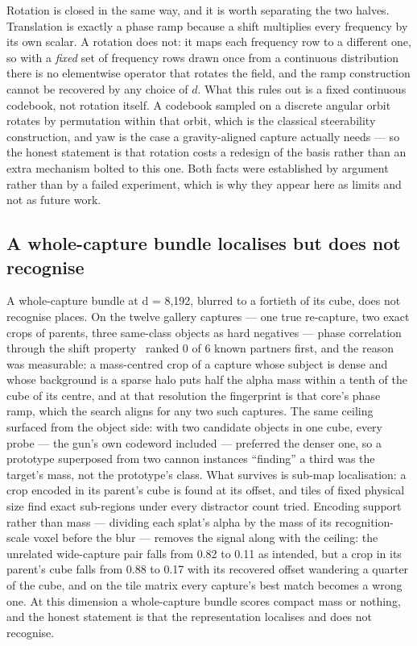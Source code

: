 \documentclass[11pt]{article}
\begin{document}
Rotation is closed in the same way, and it is worth separating the two
halves. Translation is exactly a phase ramp because a shift multiplies
every frequency by its own scalar. A rotation does not: it maps each
frequency row to a different one, so with a \emph{fixed} set of
frequency rows drawn once from a continuous distribution there is no
elementwise operator that rotates the field, and the ramp construction
cannot be recovered by any choice of $d$. What this rules out is a fixed
continuous codebook, not rotation itself. A codebook sampled on a
discrete angular orbit rotates by permutation within that orbit, which
is the classical steerability construction, and yaw is the case a
gravity-aligned capture actually needs --- so the honest statement is
that rotation costs a redesign of the basis rather than an extra
mechanism bolted to this one. Both facts were established by argument
rather than by a failed experiment, which is why they appear here as
limits and not as future work.

\subsection{A whole-capture bundle localises but does not recognise}

A whole-capture bundle at d = 8,192, blurred to a fortieth of its cube,
does not recognise places. On the twelve gallery captures --- one true
re-capture, two exact crops of parents, three same-class objects as hard
negatives --- phase correlation through the shift
property~\cite{voelker2021ssp} ranked 0 of 6 known partners first, and
the reason was measurable: a mass-centred crop of a capture whose
subject is dense and whose background is a sparse halo puts half the
alpha mass within a tenth of the cube of its centre, and at that
resolution the fingerprint is that core's phase ramp, which the search
aligns for any two such captures. The same ceiling surfaced from the
object side: with two candidate objects in one cube, every probe --- the
gun's own codeword included --- preferred the denser one, so a prototype
superposed from two cannon instances ``finding'' a third was the
target's mass, not the prototype's class. What survives is sub-map
localisation: a crop encoded in its parent's cube is found at its
offset, and tiles of fixed physical size find exact sub-regions under
every distractor count tried. Encoding support rather than mass ---
dividing each splat's alpha by the mass of its recognition-scale voxel
before the blur --- removes the signal along with the ceiling: the
unrelated wide-capture pair falls from 0.82 to 0.11 as intended, but a
crop in its parent's cube falls from 0.88 to 0.17 with its recovered
offset wandering a quarter of the cube, and on the tile matrix every
capture's best match becomes a wrong one. At this dimension a
whole-capture bundle scores compact mass or nothing, and the honest
statement is that the representation localises and does not recognise.
\end{document}
